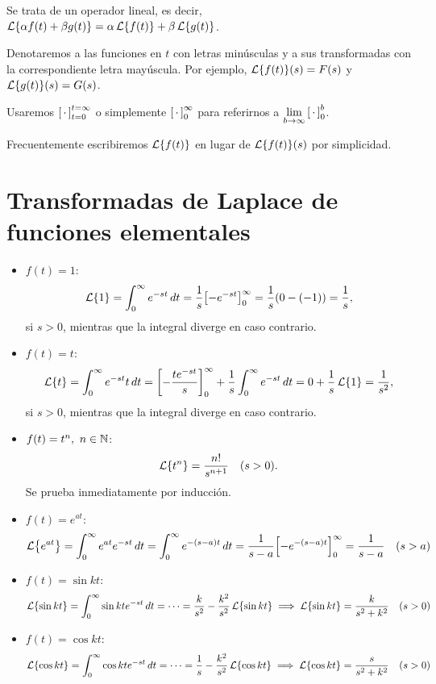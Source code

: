 \documentclass[../ecuaciones_diferenciales.tex]{subfiles}
\begin{document}
\begin{remark}
	Se trata de un operador lineal, es decir, \(\laplacetrans{\alpha f(t) + \beta g(t)} =
	\alpha \laplacetrans{f(t)} + \beta \laplacetrans{g(t)}\).
\end{remark}

\begin{notation}
	Denotaremos a las funciones en \(t\) con letras minúsculas y
	a sus transformadas con la correspondiente letra mayúscula. Por
	ejemplo, \(\laplacetrans{f(t)}(s) = F(s)\) y \(\laplacetrans{g(t)}(s) = G(s)\).
\end{notation}

\begin{notation}
	Usaremos \(\intmargins{\placeholder}{t=0}{t=\infty}\) o simplemente
	\(\intmargins{\placeholder}{0}{\infty}\) para referirnos a
	\(\lim \limits_{b \to \infty} \intmargins{\placeholder}{0}{b}\).
\end{notation}

\begin{notation}
	Frecuentemente escribiremos \(\laplacetrans{f(t)}\) en lugar de
	\(\laplacetrans{f(t)}(s)\) por simplicidad.
\end{notation}

\section{Transformadas de Laplace de funciones elementales}

\begin{itemize}
	\item \(f(t) = 1\):
	      \[\laplacetrans{1} = \int_0^\infty e^{-st} \dif t = \frac{1}{s}
		      \intmargins{-e^{-st}}{0}{\infty} = \frac{1}{s}(0-(-1)) =
		      \frac{1}{s},\]
	      si \(s > 0\), mientras que la integral diverge en caso contrario.
	\item \(f(t) = t\):
	      \[\laplacetrans{t} = \int_0^\infty e^{-st}t \dif t =
		      \intmargins{-\frac{te^{-st}}{s}}{0}{\infty} + \frac{1}{s} \int_0^\infty
		      e^{-st} \dif t = 0 + \frac{1}{s} \laplacetrans{1} = \frac{1}{s^2},\]
	      si \(s > 0\), mientras que la integral diverge en caso contrario.
	\item \(f(t) = t^n,\ n \in \mathbb{N}\):
	      \[\laplacetrans{t^n} = \frac{n!}{s^{n+1}} \quad (s>0).\]
	      Se prueba inmediatamente por inducción.
	\item \(f(t) = e^{at}\):
	      \[\laplacetrans{e^{at}} = \int_0^\infty e^{at}e^{-st} \dif t = \int_0^\infty
		      e^{-(s-a)t} \dif t = \frac{1}{s-a} \intmargins{-e^{-(s-a)t}}{0}{\infty} =
		      \frac{1}{s-a} \quad (s>a)\]
	\item \(f(t) = \sin kt\):
	      \[\laplacetrans{\sin kt} = \int_0^\infty \sin kt e^{-st} \dif t = \cdots = \frac{k}{s^2} -
		      \frac{k^2}{s^2} \laplacetrans{\sin kt} \implies \laplacetrans{\sin kt} = \frac{k}{s^2+k^2}
		      \quad (s>0)\]
	\item \(f(t) = \cos kt\):
	      \[\laplacetrans{\cos kt} = \int_0^\infty \cos kt e^{-st} \dif t = \cdots = \frac{1}{s} -
		      \frac{k^2}{s^2}\laplacetrans{\cos kt} \implies  \laplacetrans{\cos kt} = \frac{s}{s^2+k^2}
		      \quad (s>0)\]
\end{itemize}
\end{document}
